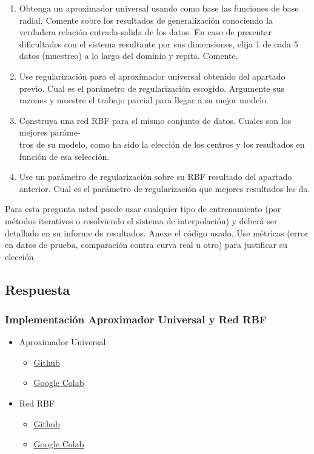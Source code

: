 \documentclass{article}
\theoremstyle{mytheoremstyle}
\theoremstyle{mytheoremstyle}
\theoremstyle{myproblemstyle}
\begin{document}
\begin{enumerate}[label=(\alph*)]
  \item Obtenga un aproximador universal usando como base las funciones de base radial. Comente sobre los resultados de generalización conociendo la verdadera relación entrada-salida de los datos. En caso de presentar dificultades con el sistema resultante por sus dimensiones, elija 1 de cada 5 datos (muestreo) a lo largo del dominio y repita. Comente.
  \item Use regularización para el aproximador universal obtenido del apartado previo. Cual es el parámetro de regularización escogido. Argumente sus razones y muestre el trabajo parcial para llegar a su mejor modelo.
  \item Construya una red RBF para el mismo conjunto de datos. Cuales son los mejores paráme-\\tros de  su modelo, como ha sido la elección de los centros y los resultados en función de esa selección.
  \item Use un parámetro de regularización sobre su RBF resultado del apartado anterior. Cual es el parámetro de regularización que mejores resultados les da.

\end{enumerate}
Para esta pregunta usted puede usar cualquier tipo de entrenamiento (por métodos iterativos o resolviendo el sistema de interpolación) y deberá ser detallado en su informe de resultados. Anexe el código usado. Use métricas (error en datos de prueba, comparación contra curva real u otro) para justificar su elección

\subsection*{Respuesta}

\subsubsection*{Implementación Aproximador Universal y Red RBF}

\begin{itemize}
  \item Aproximador Universal
        \begin{itemize}
          \item \href{https://github.com/LeoGCode/Tarea-5--RBF_SVM}{Github}
          \item \href{https://colab.research.google.com/drive/1YMrwObnLk5uxNrjW4XPzucDrESbqs2F2?usp=sharing}{Google Colab}
        \end{itemize}

  \item Red RBF
        \begin{itemize}
          \item \href{https://github.com/LeoGCode/Tarea-5--RBF_SVM}{Github}
          \item \href{https://colab.research.google.com/drive/1YMrwObnLk5uxNrjW4XPzucDrESbqs2F2?usp=sharing}{Google Colab}
        \end{itemize}
\end{itemize}
\end{document}
